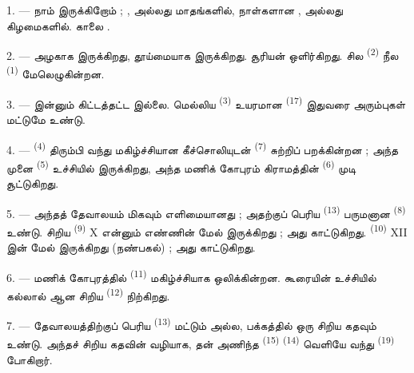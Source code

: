 \VUsaut{2.4mm}

\VUsaut{3.0mm}

1. --- நாம்  இருக்கிறோம் ; ,
 அல்லது  மாதங்களில்,  நாள்களான
,  அல்லது  கிழமைகளில். காலை
.

2. ---  அழகாக இருக்கிறது,  தூய்மையாக இருக்கிறது.
சூரியன் ஒளிர்கிறது. சில  \textsuperscript{(2)}
நீல  \textsuperscript{(1)} மேலெழுகின்றன.

3. ---   இன்னும் கிட்டத்தட்ட இல்லை. மெல்லிய
 \textsuperscript{(3)} உயரமான  \textsuperscript{(17)} இதுவரை அரும்புகள் மட்டுமே உண்டு.

4. ---  \textsuperscript{(4)} திரும்பி வந்து மகிழ்ச்சியான
கீச்சொலியுடன்  \textsuperscript{(7)} சுற்றிப்
பறக்கின்றன ; அந்த முனை  \textsuperscript{(5)} உச்சியில்
இருக்கிறது, அந்த மணிக் கோபுரம் கிராமத்தின் 
\textsuperscript{(6)} முடி சூட்டுகிறது.

\VUsaut{3.4mm}
\VUsaut{3.0mm}

5. --- அந்தத் தேவாலயம் மிகவும் எளிமையானது ; அதற்குப் பெரிய
 \textsuperscript{(13)} பருமனான 
\textsuperscript{(8)} உண்டு. சிறிய  \textsuperscript{(9)} X என்னும்
எண்ணின் மேல் இருக்கிறது ; அது  காட்டுகிறது.
 \textsuperscript{(10)} XII இன் மேல் இருக்கிறது (நண்பகல்) ;
அது  காட்டுகிறது.

6. --- மணிக் கோபுரத்தில்  \textsuperscript{(11)} மகிழ்ச்சியாக
ஒலிக்கின்றன. கூரையின் உச்சியில் கல்லால் ஆன சிறிய 
\textsuperscript{(12)} நிற்கிறது.

7. --- தேவாலயத்திற்குப் பெரிய  \textsuperscript{(13)}
மட்டும் அல்ல, பக்கத்தில் ஒரு சிறிய கதவும் உண்டு. அந்தச் சிறிய கதவின் வழியாக,
தன்  அணிந்த  \textsuperscript{(15)}
 \textsuperscript{(14)} வெளியே வந்து
 \textsuperscript{(19)} போகிறார்.

